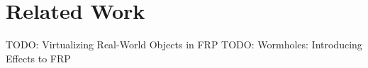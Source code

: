 \section{Related Work}
TODO: Virtualizing Real-World Objects in FRP \cite{winograd-cort_virtualizing_2012}
TODO: Wormholes: Introducing Effects to FRP \cite{winograd-cort_wormholes:_2012}